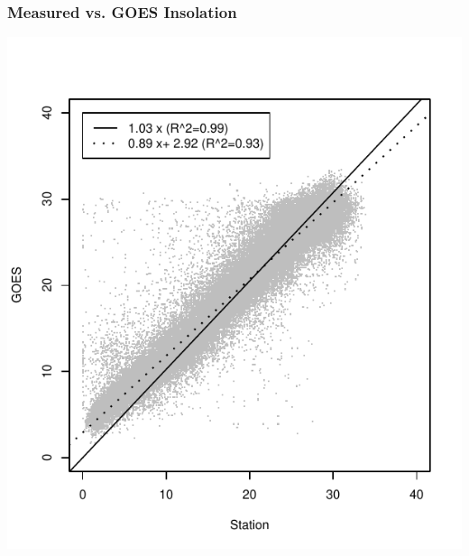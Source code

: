 \documentclass{beamer}
\begin{document}
\begin{frame}
  \frametitle{Measured vs. \ac{GOES} Insolation }
   \includegraphics{Rs_R.pdf}
\end{frame}
\end{document}

